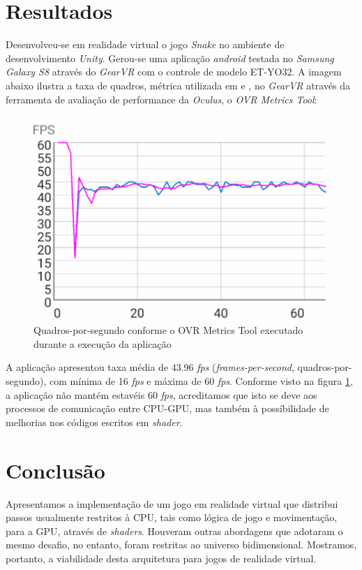 \documentclass[conference]{IEEEtran}
\begin{document}
\section{Resultados} \label{sec:results}
Desenvolveu-se em realidade virtual o jogo \textit{Snake} no ambiente de desenvolvimento \textit{Unity}. Gerou-se uma aplicação \textit{android} testada no \textit{Samsung Galaxy S8} através do \textit{GearVR} com o controle de modelo ET-YO32. A imagem abaixo ilustra a taxa de quadros, métrica utilizada em \cite{GPGPUWars} e \cite{GPGPUTechniques}, no \textit{GearVR} através da ferramenta de avaliação de performance da \textit{Oculus}, o \textit{OVR Metrics Tool}:

\begin{figure}[H] 
\centering
\includegraphics[scale=0.5]{VRPerformance}
\caption{Quadros-por-segundo conforme o OVR Metrics Tool executado durante a execução da aplicação} \label{fig:VRPerformance}
\end{figure}

A aplicação apresentou taxa média de 43.96 \textit{fps} (\textit{frames-per-second}, quadros-por-segundo), com mínima de 16 \textit{fps} e máxima de 60 \textit{fps}. Conforme visto na figura \ref{fig:VRPerformance}, a aplicação não mantém estavéis 60 \textit{fps}, acreditamos que isto se deve aos processos de comunicação entre CPU-GPU, mas também à possíbilidade de melhorias nos códigos escritos em \textit{shader}.

\section{Conclusão}\label{sec:conclusion}
Apresentamos a implementação de um jogo em realidade virtual que distribui passos usualmente restritos à CPU, tais como lógica de jogo e movimentação, para a GPU, através de \textit{shaders}. Houveram outras abordagens que adotaram o mesmo desafio, no entanto, foram restritas ao universo bidimensional. Mostramos, portanto, a viabilidade desta arquitetura para jogos de realidade virtual.
\end{document}
